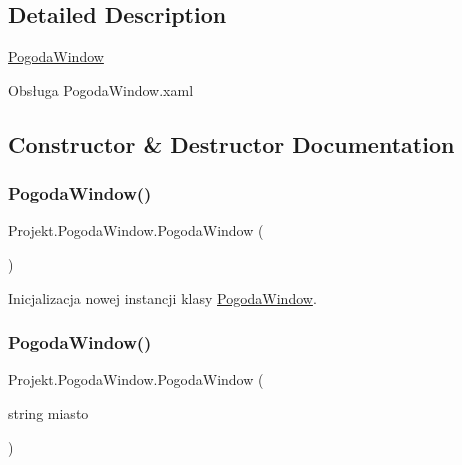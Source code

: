 \subsection{Detailed Description}
\mbox{\hyperlink{class_projekt_1_1_pogoda_window}{Pogoda\+Window}} 

Obsługa Pogoda\+Window.\+xaml

\subsection{Constructor \& Destructor Documentation}
\mbox{\label{class_projekt_1_1_pogoda_window_a7a87623d9e990514fc4e2260b2db4360}} 
\subsubsection{\texorpdfstring{PogodaWindow()}{PogodaWindow()}\hspace{0.1cm}{\footnotesize\ttfamily [1/2]}}
{\footnotesize\ttfamily Projekt.\+Pogoda\+Window.\+Pogoda\+Window (\begin{DoxyParamCaption}{ }\end{DoxyParamCaption})}



Inicjalizacja nowej instancji klasy \mbox{\hyperlink{class_projekt_1_1_pogoda_window}{Pogoda\+Window}}. 

\mbox{\label{class_projekt_1_1_pogoda_window_aaea0b7b7904650f753f846f871cd15e4}} 
\subsubsection{\texorpdfstring{PogodaWindow()}{PogodaWindow()}\hspace{0.1cm}{\footnotesize\ttfamily [2/2]}}
{\footnotesize\ttfamily Projekt.\+Pogoda\+Window.\+Pogoda\+Window (\begin{DoxyParamCaption}\item[{string}]{miasto }\end{DoxyParamCaption})}



